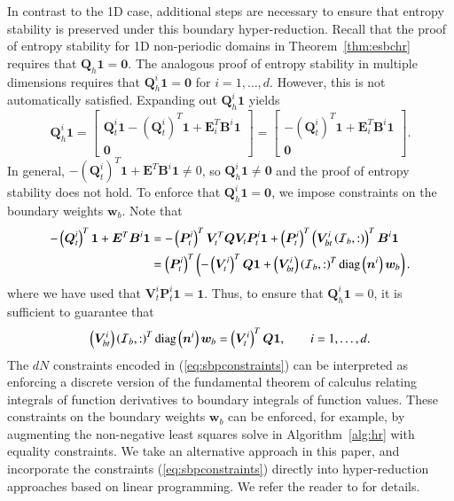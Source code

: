 \documentclass[preprint,10pt]{elsarticle}
\theoremstyle{definition}
\theoremstyle{lemma}
\theoremstyle{theorem}
\theoremstyle{assumption}
\newcommand{\LRp}[1]{\left( #1 \right)}
\newcommand{\note}[1]{{\color{blue}{#1}}}
\begin{document}
In contrast to the 1D case, additional steps are necessary to ensure that entropy stability is preserved under this boundary hyper-reduction.  Recall that the proof of entropy stability for 1D non-periodic domains in Theorem~\ref{thm:esbchr} requires that $\bm{Q}_h\bm{1} = \bm{0}$.  The analogous proof of entropy stability in multiple dimensions requires that $\bm{Q}^i_h\bm{1} = \bm{0}$ for $i = 1,\ldots, d$.  However, this is not automatically satisfied.  Expanding out $\bm{Q}^i_h\bm{1}$ yields
\[
\bm{Q}^i_h\bm{1} = \begin{bmatrix}
\bm{Q}^i_t\bm{1} - \LRp{\bm{Q}^i_t}^T\bm{1} + \bm{E}_i^T\bm{B}^i \bm{1}\\
\bm{0}
\end{bmatrix}= \begin{bmatrix}
-\LRp{\bm{Q}^i_t}^T\bm{1} + \bm{E}_i^T\bm{B}^i \bm{1}\\
\bm{0}
\end{bmatrix}.
\]
In general, $-\LRp{\bm{Q}^i_t}^T\bm{1} + \bm{E}^T\bm{B}^i \bm{1}\neq 0$, so $\bm{Q}^i_h\bm{1} \neq \bm{0}$ and the proof of entropy stability does not hold.  To enforce that $\bm{Q}^i_h\bm{1} = \bm{0}$, we impose constraints on the boundary weights $\bm{w}_b$.  Note that 
\begin{align*}
-\LRp{\bm{Q}^i_t}^T\bm{1} + \bm{E}^T\bm{B}^i \bm{1} &= -\LRp{\bm{P}^i_t}^T\bm{V}_t^T\bm{Q}\bm{V}_t\bm{P}^i_t\bm{1} + \LRp{\bm{P}^i_t}^T\LRp{\bm{V}^i_{bt}\LRp{\mathcal{I}_b,:}}^T\bm{B}^i\bm{1}\\
&= \LRp{\bm{P}^i_t}^T\LRp{-\LRp{\bm{V}^i_t}^T\bm{Q}\bm{1} + \LRp{\bm{V}^i_{bt}}\LRp{\mathcal{I}_b,:}^T{\rm diag}\LRp{\bm{n}^i}\bm{w}_b}.
\end{align*}
where we have used that $\bm{V}^i_t\bm{P}^i_t\bm{1} = \bm{1}$.  Thus, to ensure that $\bm{Q}^i_h\bm{1} = 0$, it is sufficient to guarantee that
\begin{equation}
\LRp{\bm{V}^i_{bt}}\LRp{\mathcal{I}_b,:}^T{\rm diag}\LRp{\bm{n}^i}\bm{w}_b = \LRp{\bm{V}^i_t}^T\bm{Q}\bm{1}, \qquad i = 1,\ldots, d.
\label{eq:sbpconstraints}
\end{equation}
The $dN$ constraints encoded in (\ref{eq:sbpconstraints}) can be interpreted as enforcing a discrete version of the fundamental theorem of calculus relating integrals of function derivatives to boundary integrals of function values.  These constraints on the boundary weights $\bm{w}_b$ can be enforced, for example, by augmenting the non-negative least squares solve in Algorithm~\ref{alg:hr} with equality constraints.  We take an alternative approach in this paper, and incorporate the constraints (\ref{eq:sbpconstraints}) directly into hyper-reduction approaches based on linear programming.  We refer the reader to  \cite{yano2019lp} for details.  %
\end{document}
